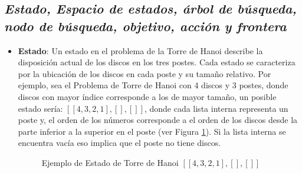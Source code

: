 \documentclass[a4paper,11pt]{article}
\begin{document}
\subsection{\textit{Estado, Espacio de estados, árbol de búsqueda, nodo de búsqueda, objetivo, acción y frontera}}
\begin{itemize}
    \item \textbf{Estado}: Un estado en el problema de la Torre de Hanoi describe la disposición actual de los discos en los tres postes. Cada estado se caracteriza por la ubicación de los discos en cada poste y su tamaño relativo. Por ejemplo, sea el Problema de Torre de Hanoi con 4 discos y 3 postes, donde discos con mayor índice corresponde a los de mayor tamaño, un posible estado sería: $[[4,3,2,1],[ ],[ ]]$, donde cada lista interna representa un poste y, el orden de los números corresponde a el orden de los discos desde la parte inferior a la superior en el poste (ver Figura \ref{fig:example_state}). Si la lista interna se encuentra vacía eso implica que el poste no tiene discos.

    \begin{figure}
        \centering
        \caption{Ejemplo de Estado de Torre de Hanoi $[[4,3,2,1],[ ],[ ]]$}
        \label{fig:example_state}
    \end{figure}
    

\end{itemize}
\end{document}
